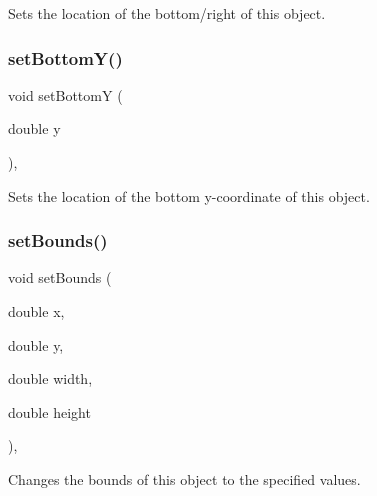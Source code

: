 Sets the location of the bottom/right of this object. 

\mbox{\label{classsgl_1_1GObject_a4b20e93c2a2597484f74ee5caa71f41f}} 
\subsubsection{\texorpdfstring{set\+Bottom\+Y()}{setBottomY()}}
{\footnotesize\ttfamily void set\+BottomY (\begin{DoxyParamCaption}\item[{double}]{y }\end{DoxyParamCaption})\hspace{0.3cm}{\ttfamily [virtual]}, {\ttfamily [inherited]}}



Sets the location of the bottom y-\/coordinate of this object. 

\mbox{\label{classsgl_1_1GObject_a2aae8197624b72265ab83b4f1bc73f2f}} 
\subsubsection{\texorpdfstring{set\+Bounds()}{setBounds()}\hspace{0.1cm}{\footnotesize\ttfamily [1/2]}}
{\footnotesize\ttfamily void set\+Bounds (\begin{DoxyParamCaption}\item[{double}]{x,  }\item[{double}]{y,  }\item[{double}]{width,  }\item[{double}]{height }\end{DoxyParamCaption})\hspace{0.3cm}{\ttfamily [virtual]}, {\ttfamily [inherited]}}



Changes the bounds of this object to the specified values. 

\mbox{\label{classsgl_1_1GObject_acada386653f008cacc7cce86426bef7c}} 

